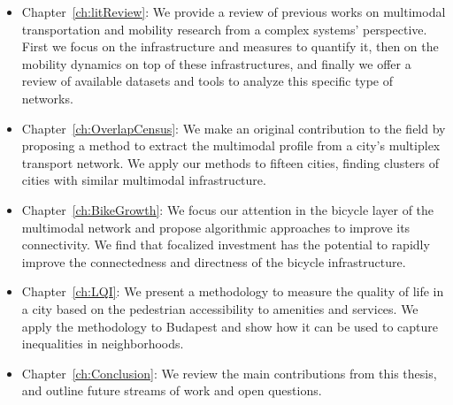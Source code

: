 \begin{itemize}
    \item Chapter~\ref{ch:litReview}: We provide a review of previous works on multimodal transportation and mobility research from a complex systems' perspective. First we focus on the infrastructure and measures to quantify it, then on the mobility dynamics on top of these infrastructures, and finally we offer a review of available datasets and tools to analyze this specific type of networks.
    \item Chapter~\ref{ch:OverlapCensus}: We make an original contribution to the field by proposing a method to extract the multimodal profile from a city's multiplex transport network. We apply our methods to fifteen cities, finding clusters of cities with similar multimodal infrastructure.
    \item Chapter~\ref{ch:BikeGrowth}: We focus our attention in the bicycle layer of the multimodal network and propose algorithmic approaches to improve its connectivity. We find that focalized investment has the potential to rapidly improve the connectedness and directness of the bicycle infrastructure.
    \item Chapter~\ref{ch:LQI}: We present a methodology to measure the quality of life in a city based on the pedestrian accessibility to amenities and services. We apply the methodology to Budapest and show how it can be used to capture inequalities in neighborhoods. 
    \item Chapter~\ref{ch:Conclusion}: We review the main contributions from this thesis, and outline future streams of work and open questions. 
\end{itemize}